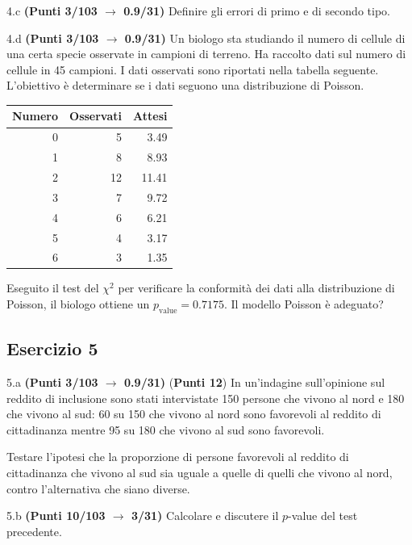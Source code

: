 \documentclass[
  11pt,
]{book}
\theoremstyle{mytheoremstyle}
\theoremstyle{mydefstyle}
\begin{document}
4.c \textbf{(Punti 3/103 \(\rightarrow\) 0.9/31)} Definire gli errori di primo e di secondo tipo.

4.d \textbf{(Punti 3/103 \(\rightarrow\) 0.9/31)} Un biologo sta studiando il numero di cellule di una certa specie osservate in campioni di terreno. Ha raccolto dati sul numero di cellule in 45 campioni. I dati osservati sono riportati nella tabella seguente. L'obiettivo è determinare se i dati seguono una distribuzione di Poisson.

\begin{table}[H]
\centering
\begin{tabular}{r|r|r}
\hline
Numero & Osservati & Attesi\\
\hline
0 & 5 & 3.49\\
\hline
1 & 8 & 8.93\\
\hline
2 & 12 & 11.41\\
\hline
3 & 7 & 9.72\\
\hline
4 & 6 & 6.21\\
\hline
5 & 4 & 3.17\\
\hline
6 & 3 & 1.35\\
\hline
\end{tabular}
\end{table}

Eseguito il test del \(\chi^2\) per verificare la conformità dei dati alla distribuzione di Poisson, il biologo ottiene un \(p_\text{value}=0.7175\). Il modello Poisson è adeguato?

\subsection{Esercizio 5}\label{esercizio-5-34}

5.a \textbf{(Punti 3/103 \(\rightarrow\) 0.9/31)} (\textbf{Punti 12}) In un'indagine sull'opinione sul reddito di inclusione sono stati intervistate 150 persone che vivono al nord e 180 che vivono al sud: 60 su 150 che vivono al nord sono favorevoli al reddito di cittadinanza mentre 95 su 180 che vivono al sud sono favorevoli.

Testare l'ipotesi che la proporzione di persone favorevoli al reddito di cittadinanza che vivono al sud sia uguale a quelle di quelli che vivono al nord, contro l'alternativa che siano diverse.

5.b \textbf{(Punti 10/103 \(\rightarrow\) 3/31)} Calcolare e discutere il \(p\)-value del test precedente.
\end{document}
